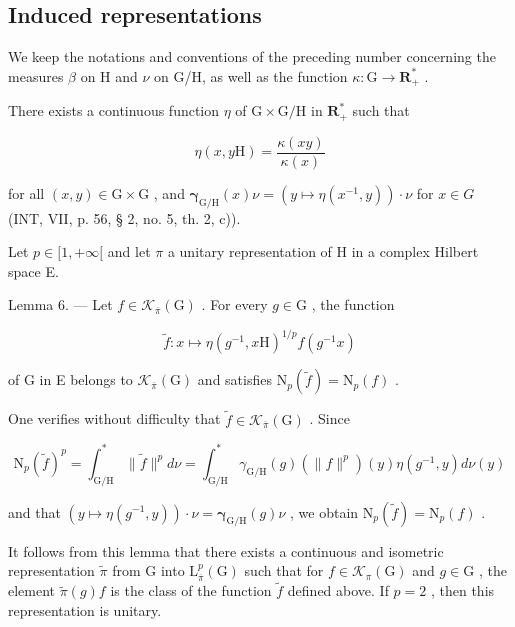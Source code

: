 \subsection{Induced representations}

We keep the notations and conventions of the preceding number concerning the measures \(\beta\) on H and \(\nu\) on G/H, as well as the function \(\kappa\colon\mathrm{G}\to\mathbf{R}_{+}^{*}\) .

There exists a continuous function \(\eta\) of \(\mathrm{G} \times \mathrm{G} / \mathrm{H}\) in \(\mathbf{R}_{+}^{*}\) such that

\[
\eta (x, y \mathrm{H}) = \frac {\kappa (x y)}{\kappa (x)}
\]

for all \((x,y)\in\mathrm{G}\times\mathrm{G}\) , and \(\boldsymbol{\gamma}_{\mathrm{G}/\mathrm{H}}(x)\nu=(y\mapsto\eta(x^{-1},y))\cdot\nu\) for \(x\in G\) (INT, VII, p. 56, § 2, no. 5, th. 2, c)).

Let \(p \in [1, +\infty[\) and let \(\pi\) a unitary representation of H in a complex Hilbert space E.

Lemma 6. --- Let \(f \in \mathcal{K}_{\overline{\pi}}(\mathrm{G})\) . For every \(g \in \mathrm{G}\) , the function

\[
\widetilde {f} \colon x \mapsto \eta (g ^ {- 1}, x \mathrm{H}) ^ {1 / p} f (g ^ {- 1} x)
\]

of G in E belongs to \(\mathcal{K}_{\overline{\pi}}(\mathrm{G})\) and satisfies \(\mathrm{N}_p(\widetilde{f}) = \mathrm{N}_p(f)\) .

One verifies without difficulty that \(\tilde{f} \in \mathcal{K}_{\overline{\pi}}(\mathrm{G})\) . Since

\[
\mathrm{N} _ {p} (\widetilde {f}) ^ {p} = \int_ {\mathrm{G/H}} ^ {*} \| \widetilde {f} \| ^ {p} d \nu = \int_ {\mathrm{G/H}} ^ {*} \gamma_ {\mathrm{G/H}} (g) (\| f \| ^ {p}) (y) \eta (g ^ {- 1}, y) d \nu (y)
\]

 and that \((y\mapsto \eta (g^{-1},y))\cdot \nu = \pmb{\gamma}_{\mathrm{G / H}}(g)\nu\) , we obtain \(\mathrm{N}_p(\widetilde{f}) = \mathrm{N}_p(f)\) .

 It follows from this lemma that there exists a continuous and isometric representation \(\widetilde{\pi}\) from G into \(\mathrm{L}_{\overline{\pi}}^{p}(\mathrm{G})\) such that for \(f\in \mathcal{K}_{\pi}(\mathrm{G})\) and \(g\in \mathrm{G}\) , the element \(\widetilde{\pi}(g)f\) is the class of the function \(\widetilde{f}\) defined above. If \(p=2\) , then this representation is unitary.

